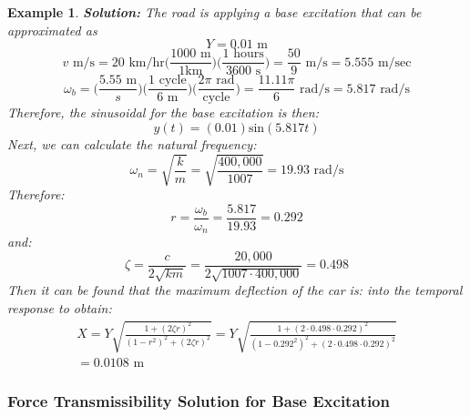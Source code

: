 \documentclass[12pt,letter]{article}
\newtheorem{ex}{Example}
\numberwithin{ex}{section} %
\newenvironment{example}{\begin{mdframed}[middlelinewidth=0.5mm]\begin{ex}\normalfont}{\end{ex}\end{mdframed}}
\numberwithin{re}{section} %
\begin{document}
\begin{example}
					\noindent\textbf{Solution:} The road is applying a base excitation that can be approximated as 
					\begin{equation}
						Y = 0.01 \text{ m}
					\end{equation} 				
					\begin{equation}
						v \text{ m/s} = 20 \text{ km/hr}\Bigg(\frac{1000 \text{ m}}{1 \text {km}}\Bigg) \Bigg(\frac{1 \text{ hours}}{3600 \text { s}}\Bigg) = \frac{50}{9} \text{ m/s} = 5.555 \text{ m/sec}
					\end{equation} 	
					\begin{equation}
						\omega_b = \Bigg(\frac{ 5.55 \text{ m}}{s}\Bigg) \Bigg(\frac{ 1 \text{ cycle}}{6 \text{ m}}\Bigg) \Bigg(\frac{ 2 \pi \text{ rad}}{\text {cycle}}\Bigg) = \frac{ 11.11 \pi }{6 } \text{ rad/s} =5.817 \text{ rad/s} 
					\end{equation} 	
					Therefore, the sinusoidal for the base excitation is then:
					\begin{equation}
						y(t) = (0.01) \text{sin}(5.817 t)
					\end{equation} 	
					Next, we can calculate the natural frequency:
					\begin{equation}
						\omega_n = \sqrt{\frac{k}{m}} = \sqrt{\frac{400,000}{1007}} = 19.93 \text{ rad/s}
					\end{equation} 			
					Therefore:
					\begin{equation}
					r=\frac{\omega_b}{\omega_n} = \frac{5.817}{19.93} =0.292
					\end{equation} 		
					and:
					\begin{equation}
					\zeta = \frac{c}{2\sqrt{km}}= \frac{20,000}{2\sqrt{1007\cdot400,000}} = 0.498
					\end{equation}	
					Then it can be found that the maximum deflection of the car is:
					into the temporal response to obtain:
					\begin{equation}
					\begin{split}
					X = Y \sqrt{\frac{1+(2 \zeta r)^2}{(1-r^2)^2 + (2 \zeta r )^2}} = Y \sqrt{\frac{1+(2 \cdot 0.498 \cdot 0.292)^2}{(1-0.292^2)^2 + (2 \cdot 0.498 \cdot 0.292 )^2}}  \\ = 0.0108 \text{ m}
					\end{split}
					\end{equation} 		
				\end{example}	
					
			\subsubsection{Force Transmissibility Solution for Base Excitation}
			
\end{document}
